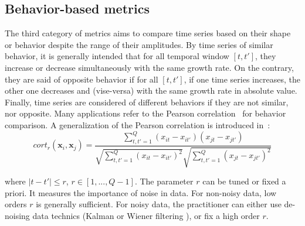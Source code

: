 \subsection{Behavior-based metrics}

The third category of metrics aims to compare time series based on their shape or behavior despite the range of their amplitudes. By time series of similar behavior, it is generally intended that for all temporal window $[t,t']$, they increase or decrease simultaneously with the same growth rate. On the contrary, they are said of opposite behavior if for all $[t,t']$, if one time series increases, the other one decreases and (vise-versa) with the same growth rate in absolute value. Finally, time series are considered of different behaviors if they are not similar, nor opposite. Many applications refer to the Pearson correlation~\cite{Abraham2010a,Benesty2009} for behavior comparison. A generalization of the Pearson correlation is introduced in~\cite{AhlameDouzal-Chouakria2011}: 
\begin{equation}	
	cort_r(\textbf{x}_i,\textbf{x}_j) = 
	\frac{
		\sum\limits_{t,t'=1}^Q 
		{
			(x_{it}-x_{it'})
			(x_{jt}-x_{jt'})
		}
	}
	{
		\sqrt{
			\sum\limits_{t,t'=1}^Q  
			{(x_{it}-x_{it'})^2}
		} 
		\sqrt{
			\sum\limits_{t,t'=1}^Q  
			{(x_{jt}-x_{jt'})^2}
		} 	 
	}
\label{eq:corTr}
\end{equation}

\noindent where $|t-t'| \leq r$, $r \in [1,..., Q-1]$. The parameter $r$ can be tuned or fixed a priori. It measures the importance of noise in data. For non-noisy data, low orders $r$ is generally sufficient. For noisy data, the practitioner can either use de-noising data technics (Kalman or Wiener filtering \cite{Kalman1960,WienerN1942}), or fix a high order $r$.


